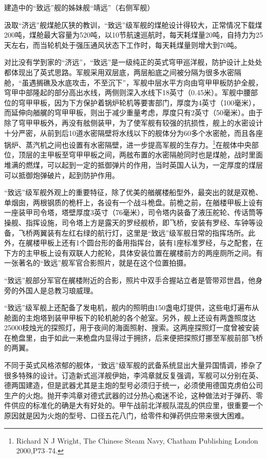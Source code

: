 \documentclass[12pt,UTF8]{ctexbook}
\begin{document}
建造中的“致远”舰的姊妹舰“靖远”（右侧军舰）

汲取“济远”舰煤舱仄狭的教训，“致远”级军舰的煤舱设计得较大，正常情况下载煤200吨，煤舱最大容量为520吨，以10节航速巡航时，每天耗煤量20吨，自持力为25天左右，而当轮机处于强压通风状态下工作时，每天耗煤量则增大到70吨。

对比没有学到家的“济远”，“致远”是一级纯正的英式穹甲巡洋舰，防护设计上处处都体现出了英式思路。军舰采用双层底，两层船底之间被分隔为很多水密隔舱，“虽遇搁礁及水底攻击，不至沉下”，军舰中层水平方向由穹甲甲板防护全舰，穹甲中部隆起的部分高出水线，两侧则深入水线下18英寸（0.45米）。军舰中腰部位的穹甲甲板，因为下方保护着锅炉轮机等要害部门，厚度为4英寸（100毫米），而延伸向艏艉的穹甲甲板，则出于减少重量考虑，厚度只有2英寸（50毫米）。由于除了穹甲甲板外，再没有舷侧装甲，为了使军舰有较强的抗损性，舰上的水密设计十分严密，从前到后10道水密隔壁将水线以下的舰体分为60多个水密舱，而且各座锅炉、蒸汽机之间也设置有水密隔壁，进一步提高军舰的生存力。\footnote{Richard N J Wright, The Chinese Steam Navy, Chatham Publishing London 2000,P73--74. }在舰体中央部位，顶层的主甲板至穹甲甲板之间，两舷布置的水密隔舱同时也是煤舱，战时里面堆满的燃煤，可以起到一定的抵御弹片的作用，当时英国人认为，一定厚度的煤层可以抵御炮弹破片，起到防护作用。

“致远”级军舰外观上的重要特征，除了优美的艏艉楼船型外，最突出的就是双桅、单烟囱，两根钢质的桅杆上，各设有一个战斗桅盘。前桅之前，在艏楼甲板上设有一座装甲司令塔，塔壁厚度3英寸（76毫米），司令塔内装备了液压舵轮、传话筒等操舰、指挥设施，司令塔上方是露天的罗经舰桥，即飞桥，安装有罗经、车钟等设备，飞桥两翼装有左红右绿的航行灯，这里是“致远”级军舰日常的指挥场所。此外，在艉楼甲板上还有1个圆台形的备用指挥台，装有1座标准罗经，与之配套，在下方的主甲板上设有双联人力舵轮，具体安装位置在艉楼前方的两座厕所之间。有一张著名的“致远”舰军官合影照片，就是在这个位置拍摄。

“致远”舰部分军官在艉楼附近的合影，照片中双手合握站立者是管带邓世昌，他身旁的外国人是总教习琅威理。

“致远”级军舰上还配备了发电机，舰内的照明由150盏电灯提供，这些电灯遍布从舱面的主炮塔到装甲甲板下的轮机舱的各个舱室。另外，舰上还设有两盏照度达25000枝烛光的探照灯，用于夜间的海面照射、搜索。这两座探照灯一度曾被安装在桅盘里，由于如此一来桅盘内显得过于拥挤，后来便把探照灯挪至军舰前部飞桥的两翼。

不同于英式风格浓郁的舰体，“致远”级军舰的武备系统显出大量异国情调，掺杂了很多特殊的设计。订造新式巡洋舰伊始，李鸿章就反复强调，军舰可以分别在英、德两国建造，但是武器尤其是主炮的型号必须归于统一，必须使用德国克虏伯公司生产的火炮。抛开李鸿章对德式武器的过分热心痴迷不论，这种做法对于弹药、零件供应的标准化的确是大有好处的。甲午战前北洋舰队混乱的供应里，很重要一个原因就是因为火炮的型号、口径五花八门，给零件和弹药供应带来很大困难。
\end{document}
